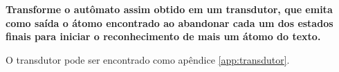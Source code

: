 
\textbf{Transforme o autômato assim obtido em um transdutor, que emita como saída o átomo encontrado ao abandonar cada um dos estados finais para iniciar o reconhecimento de mais um átomo do texto.}

O transdutor pode ser encontrado como apêndice \ref{app:transdutor}.
